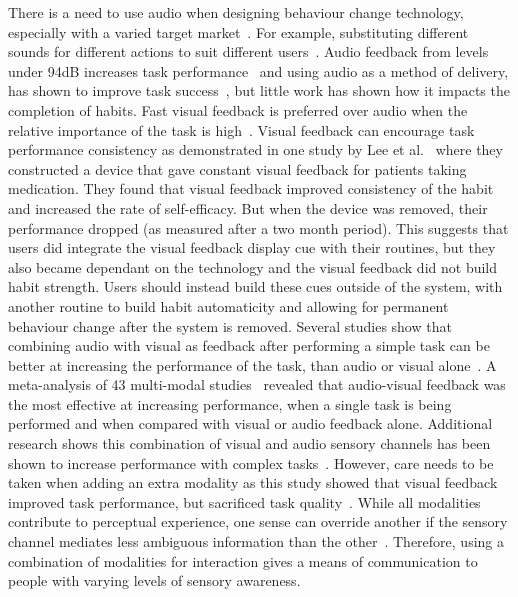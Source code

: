 \documentclass{scaffold/sigchi}
\begin{document}
There is a need to use audio when designing behaviour change technology, especially with a varied target market~\cite{article_designing_for_health_behaviour_change_hci}. For example, substituting different sounds for different actions to suit different users~\cite{article_movipill_improving_medication_elders}. Audio feedback from levels under 94dB increases task performance~\cite{high_audio_feedback_negative_performance} and using audio as a method of delivery, has shown to improve task success~\cite{auditory_notifications_increase_delivery_success}, but little work has shown how it impacts the completion of habits. Fast visual feedback is preferred over audio when the relative importance of the task is high~\cite{visual_mode_better}. Visual feedback can encourage task performance consistency as demonstrated in one study by Lee et al.~\cite{article_realtime_feedback_improving_medication_taking} where they constructed a device that gave constant visual feedback for patients taking medication. They found that visual feedback improved consistency of the habit and increased the rate of self-efficacy. But when the device was removed, their performance dropped (as measured after a two month period). This suggests that users did integrate the visual feedback display cue with their routines, but they also became dependant on the technology and the visual feedback did not build habit strength. Users should instead build these cues outside of the system, with another routine to build habit automaticity and allowing for permanent behaviour change after the system is removed. Several studies show that combining audio with visual as feedback after performing a simple task can be better at increasing the performance of the task, than audio or visual alone~\cite{benefits_of_audio_visual_1, benefits_of_audio_visual_2}. A meta-analysis of 43 multi-modal studies~\cite{comparing_modalities_effects_of_visual_auditory} revealed that audio-visual feedback was the most effective at increasing performance, when a single task is being performed and when compared with visual or audio feedback alone. Additional research shows this combination of visual and audio sensory channels has been shown to increase performance with complex tasks~\cite{chi_oussama_tap_the_shapetones}. However, care needs to be taken when adding an extra modality as this study showed that visual feedback improved task performance, but sacrificed task quality~\cite{comparing_modalities_effects_of_visual_auditory}. While all modalities contribute to perceptual experience, one sense can override another if the sensory channel mediates less ambiguous information than the other~\cite{one_mode_override_another}. Therefore, using a combination of modalities for interaction gives a means of communication to people with varying levels of sensory awareness.
\end{document}
